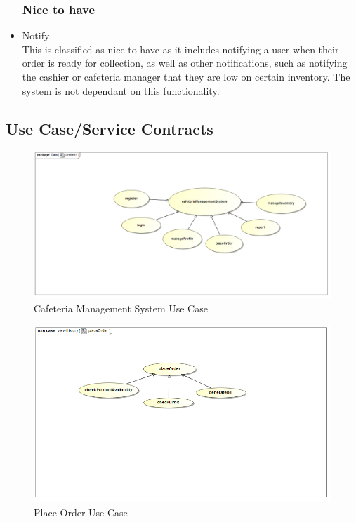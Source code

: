 \documentclass[a4paper,12pt]{article}
\begin{document}
\begin{itemize}
\subsubsection{Nice to have}
\item Notify \\
This is classified as nice to have as it includes notifying a user when their order is ready for collection, as well as other notifications, such as notifying the cashier or cafeteria manager that they are low on certain inventory.  The system is not dependant on this functionality.

\end{itemize}

\subsection{Use Case/Service Contracts}

\begin{figure}[H]
  \centering
    \includegraphics[width=1.0\textwidth]{images/CMSUseCase.png}
    \caption{Cafeteria Management System Use Case} 
\end{figure}

\begin{figure}[H]
  \centering
    \includegraphics[width=1.0\textwidth]{images/placeOrder.png}
    \caption{Place Order Use Case} 
\end{figure}
\end{document}
